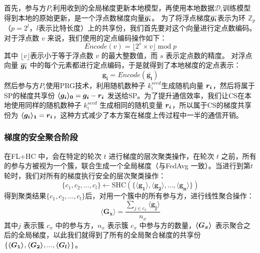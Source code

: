 首先，参与方$P_i$利用收到的全局梯度更新本地模型，再使用本地数据$\mathcal{D}_i$训练模型得到本地的原始更新，是一个浮点数梯度向量$\overline{\bs{g_i}}$。
为了将浮点梯度$\overline{\bs{g_i}}$表示为环 $\mathbb{Z}_p$（$p=2^l$，$l$表示比特长度）上的共享份，我们首先要对这个向量进行定点数编码。
对于浮点数 $v$ 来说，我们使用的定点编码操作如下：
\begin{equation}
	Encode(v) = \lfloor 2^s \times v\rfloor \;\text{mod}\;p
\end{equation}
其中 $\lfloor v\rfloor$表示小于等于浮点数 $v$ 的最大整数值，而 $s$ 表示定点数的精度。
对浮点向量 $\overline{\bs{g_i}}$ 中的每个元素都进行定点编码，于是就得到了本地梯度的定点表示：
\begin{equation}
	\boldsymbol{g_i} = Encode(\overline{\boldsymbol{g_i}})
\end{equation}
然后参与方$P_i$使用PRG技术，利用随机数种子 $k_i^{seed}$生成随机向量 $\bs{r_i}$，然后将属于SP的梯度共享份 $\svec[0]{g_i} = \bs{g_i} - \bs{r_i}$ 发送给SP。为了提升通信效率，我们让CS在本地使用同样的随机数种子 $k_i^{seed}$ 生成相同的随机变量 $\bs{r_i}$，所以属于CS的梯度共享份为 $\svec[1]{g_i} = \bs{r_i}$，这种方式减少了本方案在梯度上传过程中一半的通信开销。

\subsubsection{梯度的安全聚合阶段}
在FL+HC \cite{briggs2020federated}中，会在特定的轮次 $t$ 进行梯度的层次聚类操作，在轮次 $t$ 之前，所有的参与方被视为一个簇，联合生成一个全局梯度（与FedAvg \cite{mcmahan2017communication} 一致）。当进行到第$t$轮时，我们对所有的梯度执行安全的层次聚类操作：
\begin{equation}
	\{c_1,c_2,...,c_l \} \leftarrow \text{SHC}(\{\boldsymbol{\langle g_1\rangle}, \boldsymbol{\langle g_2\rangle},...,\boldsymbol{\langle g_n\rangle} \})
\end{equation}
得到聚类结果$\{c_1,c_2,...,c_l \}$后，对用一个簇中的所有参与方，进行线性聚合操作：
\begin{equation}
	\boldsymbol{\langle G_x\rangle} = \frac{\sum_{j \in c_x}\boldsymbol{\langle g_j\rangle}}{n_x}
\end{equation}
其中$j$ 表示簇 $c_x$ 中的参与方，$n_x$ 表示簇 $c_x$ 中参与方的数量，$\svec{G_x}$ 表示聚合之后的全局梯度，以此我们就得到了所有的全局聚合梯度的共享份 $\{\svec{G_1},\svec{G_2},...,\svec{G_l}\}$。


